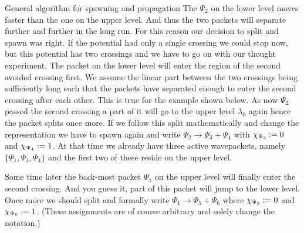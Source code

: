 \begin{chapter}{General algorithm for spawning and propagation}
The $\Psi_2$ on the lower level moves faster than the one on the upper level.
And thus the two packets will separate further and further in the
long run. For this reason our decision to split and spawn was right. If the potential
had only a single crossing we could stop now, but this potential has two crossings
and we have to go on with our thought experiment. The packet on the lower level will enter
the region of the second avoided crossing first. We assume the linear part between
the two crossings being sufficiently long such that the packets have separated
enough to enter the second crossing after each other. This is true for the
example shown below. As now $\Psi_2$ passed the second crossing a part of it will
go to the upper level $\lambda_0$ again hence the packet splits once more. If we
follow this split mathematically and change the representation we have to spawn
again and write $\Psi_2 \rightarrow \Psi_3 + \Psi_4$ with $\chi_{\Psi_3} := 0$
and $\chi_{\Psi_4} := 1$. At that time we already have three active wavepackets,
namely $\{\Psi_1, \Psi_3, \Psi_4\}$ and the first two of these reside on the upper
level.

Some time later the back-most packet $\Psi_1$ on the upper level will finally
enter the second crossing. And you guess it, part of this packet will jump to
the lower level. Once more we should split and formally write $\Psi_1 \rightarrow \Psi_5 + \Psi_6$
where $\chi_{\Psi_5} := 0$ and $\chi_{\Psi_6} := 1$. (These assignments
are of course arbitrary and solely change the notation.)


\end{chapter}
